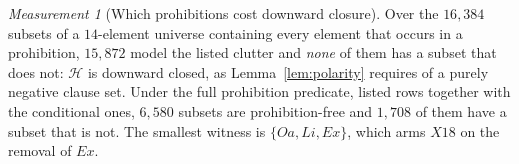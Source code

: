 \documentclass[11pt,reqno]{amsart}
\theoremstyle{plain}
\theoremstyle{definition}
\theoremstyle{remark}
\newtheorem{measurement}[theorem]{Measurement}
\begin{document}
\begin{measurement}[Which prohibitions cost downward closure]\label{meas:downward}
Over the $16{,}384$ subsets of a $14$-element universe containing every element
that occurs in a prohibition, $15{,}872$ model the listed clutter and \emph{none}
of them has a subset that does not: $\mathcal{H}$ is downward closed, as
Lemma~\ref{lem:polarity} requires of a purely negative clause set. Under the
full prohibition predicate, listed rows together with the conditional ones,
$6{,}580$ subsets are prohibition-free and $1{,}708$ of them have a subset that
is not. The smallest witness is $\{Oa,Li,Ex\}$, which arms $X18$ on the removal
of $Ex$.
\end{measurement}



\end{document}
